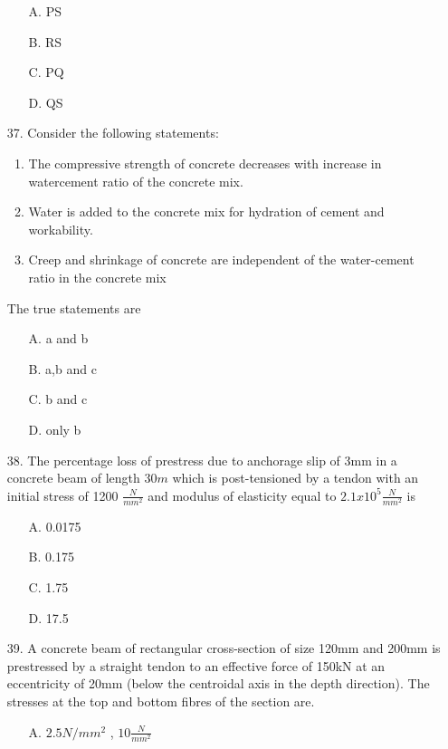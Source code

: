 \documentclass[journal]{IEEEtran}
\begin{document}
\begin{enumerate}
    \begin{enumerate}
        \item [A.] PS
        \item [B.] RS
        \item [C.] PQ
        \item [D.] QS
    \end{enumerate}
  \item[37.]  Consider the following statements: 
  \begin{enumerate}
    \item The compressive strength of concrete decreases with increase in watercement ratio of the concrete mix.
    \item Water is added to the concrete mix for hydration of cement and
    workability. 
    \item Creep and shrinkage of concrete are independent of the water-cement ratio
    in the concrete mix
  \end{enumerate}
  The true statements are 
  \begin{enumerate}
    \item [A.] a and b
    \item [B.] a,b and c
    \item [C.] b and c
    \item [D.] only b
  \end{enumerate}
  \item [38.] The percentage loss of prestress due to anchorage slip of 3mm in a concrete beam
  of length $30m$ which is post-tensioned by a tendon with an initial stress of 1200 $\frac{N}{mm^2}$
  and modulus of elasticity equal to $2.1 x 10^5\frac{N}{mm^2}$ is
  \begin{enumerate}
    \item [A.] 0.0175 
    \item [B.] 0.175 
    \item [C.] 1.75 
    \item [D.] 17.5 
  \end{enumerate}
  \item [39.] A concrete beam of rectangular cross-section of size 120mm  and 200mm
   is prestressed by a straight tendon to an effective force of 150kN at an
  eccentricity of 20mm (below the centroidal axis in the depth direction). The
  stresses at the top and bottom fibres of the section are.
  \begin{enumerate}
    \item [A.] $2.5N/mm^2$ , $10\frac{N}{mm^2}$ 

\end{enumerate}
\end{enumerate}
\end{document}
